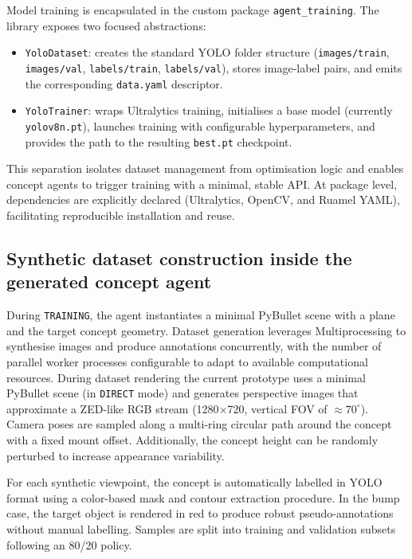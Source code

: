 \documentclass[a4paper, twoside]{article}
\begin{document}
Model training is encapsulated in the custom package \texttt{agent\_training}.
The library exposes two focused abstractions:

\begin{itemize}
    \item \texttt{YoloDataset}: creates the standard YOLO folder structure (\texttt{images/train}, \texttt{images/val}, \texttt{labels/train}, \texttt{labels/val}), stores image-label pairs, and emits the corresponding \texttt{data.yaml} descriptor.
    \item \texttt{YoloTrainer}: wraps Ultralytics training, initialises a base model (currently \texttt{yolov8n.pt}), launches training with configurable hyperparameters, and provides the path to the resulting \texttt{best.pt} checkpoint.
\end{itemize}

This separation isolates dataset management from optimisation logic and enables concept agents to trigger training with a minimal, stable API.
At package level, dependencies are explicitly declared (Ultralytics, OpenCV, and Ruamel YAML), facilitating reproducible installation and reuse.

\subsection{Synthetic dataset construction inside the generated concept agent}

During \texttt{TRAINING}, the agent instantiates a minimal PyBullet scene with a plane and the target concept geometry.
Dataset generation leverages Multiprocessing to synthesise images and produce annotations concurrently, with the number of parallel worker processes configurable to adapt to available computational resources.
During dataset rendering the current prototype uses a minimal PyBullet scene (in \texttt{DIRECT} mode) and generates perspective images that approximate a ZED-like RGB stream (1280$\times$720, vertical FOV of $\approx70^{\circ}$). Camera poses are sampled along a multi-ring circular path around the concept with a fixed mount offset. Additionally, the concept height can be randomly perturbed to increase appearance variability.

For each synthetic viewpoint, the concept is automatically labelled in YOLO format using a color-based mask and contour extraction procedure.
In the bump case, the target object is rendered in red to produce robust pseudo-annotations without manual labelling.
Samples are split into training and validation subsets following an 80/20 policy.
\end{document}
